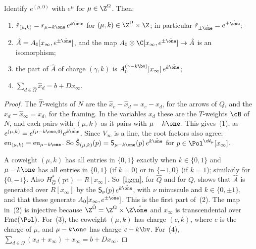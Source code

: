 \begin{lemma}\label{lem:bps-split}
Identify $e^{(\mu,0)}$ with $e^\mu$ for $\mu\in\Z^\Omega$.  Then:
\begin{enumerate}[leftmargin=2em]
\item $\hat r_{(\mu,k)}=r_{\mu-k\one}\,e^{k\hat\one}$ for $(\mu,k)\in\Z^\Omega\times\Z$;
in particular $\hat r_{\pm\hat\one}=e^{\pm\hat\one}$;
\item $\hat A=A_0[x_\infty,e^{\pm\hat\one}]$, and the map
$A_0\otimes\C[x_\infty,e^{\pm\hat\one}]\to\hat A$ is an isomorphism;
\item the part of $\hat A$ of charge $(\gamma,k)$ is
$A_0^{(\gamma-k\bv)}[x_\infty]\,e^{k\hat\one}$;
\item $\sum_{d\in\hat\Omega}\hat x_d=b+Dx_\infty$.
\end{enumerate}
\end{lemma}

\begin{proof}
The $\hat T$-weights of $N$ are the $\hat x_e-\hat x_d=x_e-x_d$, for the arrows
of $Q$, and the $\hat x_d-\hat x_\infty=x_d$, for the framing.  In the
variables $x_d$ these are the $T$-weights $\cB$ of $N$, and each pairs with
$(\mu,k)$ as it pairs with $\mu-k\one$.  This gives~(1), as
$e^{(\mu,k)}=e^{(\mu-k\one,0)}e^{k\hat\one}$.  Since $V_\infty$ is a line,
the root factors also agree: $\mathrm{eu}_{(\mu,k)}=\mathrm{eu}_{\mu-k\one}$.
So $\hat{\mathsf S}_{(\mu,k)}(p)=\mathsf S_{\mu-k\one}(p)\,e^{k\hat\one}$ for
$p\in\Pol^{\cW_\mu}[x_\infty]$.

A coweight $(\mu,k)$ has all entries in $\{0,1\}$ exactly when
$k\in\{0,1\}$ and $\mu-k\one$ has all entries in $\{0,1\}$ (if $k=0$) or in
$\{-1,0\}$ (if $k=1$); similarly for $\{0,-1\}$.  Also
$H^*_{\hat G}(\mathrm{pt})=R[x_\infty]$.  So~\ref{I:gen}, for $\hat Q$ and for $Q$,
shows that $\hat A$ is generated over $R[x_\infty]$ by the
$\mathsf S_\nu(p)\,e^{k\hat\one}$, with $\nu$ minuscule and $k\in\{0,\pm1\}$,
and that these generate $A_0[x_\infty,e^{\pm\hat\one}]$.  This is the first
part of~(2).  The map in~(2) is injective because
$\Z^{\hat\Omega}=\Z^\Omega\times\Z\hat\one$ and $x_\infty$ is transcendental
over $\mathrm{Frac}(\Pol)$.  For~(3), the coweight $(\mu,k)$ has charge
$(c,k)$, where $c$ is the charge of $\mu$, and $\mu-k\one$ has charge
$c-k\bv$.  For~(4), $\sum_{d\in\Omega}(x_d+x_\infty)+x_\infty=b+Dx_\infty$.
\end{proof}

